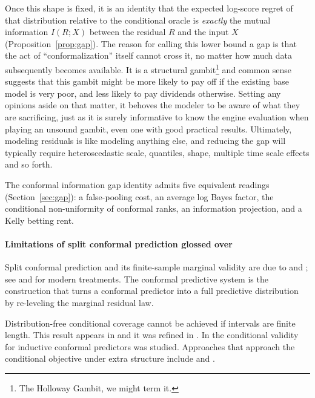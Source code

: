 \documentclass[11pt]{article}
\theoremstyle{definition}
\begin{document}
Once this shape is fixed, it is an identity that the expected log-score regret of that distribution relative to the
conditional oracle is \emph{exactly} the mutual information $I(R;X)$ between the residual
$R$ and the input $X$ (Proposition~\ref{prop:gap}). The reason for calling this lower bound a gap is that the act of ``conformalization'' itself
cannot cross it, no matter how much data subsequently becomes available. It is a structural gambit\footnote{The Holloway Gambit, we might term it.} and
common sense suggests that this gambit might be more likely to pay off if the existing base model is very poor, and less likely to pay dividends otherwise. Setting
any opinions aside on that matter, it behoves the modeler to be aware of what they are sacrificing, just as it is surely informative to know the
engine evaluation when playing an unsound gambit, even one with good practical results. Ultimately, modeling residuals is like modeling anything
else, and reducing the gap will typically require heteroscedastic
scale, quantiles, shape, multiple time scale effects and so forth.


The conformal information gap identity admits five equivalent readings (Section~\ref{sec:gap}): a
false-pooling cost, an average log Bayes factor, the conditional non-uniformity of
conformal ranks, an information projection, and a Kelly betting rent.

\paragraph{Limitations of split conformal prediction glossed over}

Split conformal prediction and its finite-sample marginal validity are due to
\citet{vovk2005algorithmic} and \citet{lei2018distribution}; see \citet{angelopoulos2023gentle}
and \citet{angelopoulos2025theoretical} for modern treatments. The conformal predictive
system \citep{vovk2019nonparametric} is the construction that turns a conformal predictor
into a full predictive distribution by re-leveling the marginal residual law.

Distribution-free conditional coverage cannot be achieved if intervals are finite length. This result
appears in \citet{lei2014distribution} and it was refined in
\citet{barber2021limits}. In \citet{vovk2012conditional} the conditional validity for
inductive conformal predictors was studied. Approaches that approach the conditional objective under
extra structure include \citet{gibbs2025conditional} and \citet{laplante2026pivotal}.
\end{document}
